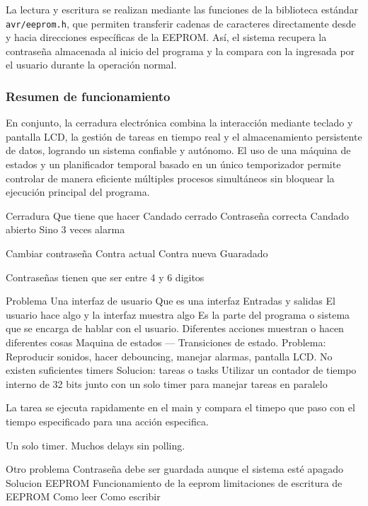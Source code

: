 La lectura y escritura se realizan mediante las funciones de la biblioteca estándar \texttt{avr/eeprom.h}, que permiten transferir cadenas de caracteres directamente desde y hacia direcciones específicas de la EEPROM. Así, el sistema recupera la contraseña almacenada al inicio del programa y la compara con la ingresada por el usuario durante la operación normal.

\vspace{1em}

\subsubsection{Resumen de funcionamiento}

En conjunto, la cerradura electrónica combina la interacción mediante teclado y pantalla LCD, la gestión de tareas en tiempo real y el almacenamiento persistente de datos, logrando un sistema confiable y autónomo. El uso de una máquina de estados y un planificador temporal basado en un único temporizador permite controlar de manera eficiente múltiples procesos simultáneos sin bloquear la ejecución principal del programa.


\vspace{1em}

Cerradura
Que tiene que hacer
Candado cerrado
Contraseña correcta
Candado abierto
Sino 3 veces alarma

Cambiar contraseña
Contra actual
Contra nueva
Guaradado

Contraseñas tienen que ser entre 4 y 6 digitos

Problema
Una interfaz de usuario
Que es una interfaz
Entradas y salidas
El usuario hace algo y la interfaz muestra algo
Es la parte del programa o sistema que se encarga
de hablar con el usuario.
Diferentes acciones muestran o hacen diferentes cosas
Maquina de estados --- Transiciones de estado.
Problema: Reproducir sonidos, hacer debouncing, manejar alarmas, pantalla LCD. 
No existen suficientes timers
Solucion: tareas o tasks
Utilizar un contador de tiempo interno de 32 bits
junto con un solo timer para manejar tareas en paralelo

La tarea se ejecuta rapidamente en el main y compara el timepo que paso con 
el tiempo especificado para una acción especifica.

Un solo timer. Muchos delays sin polling.

Otro problema
Contraseña debe ser guardada aunque el sistema esté apagado
Solucion EEPROM
Funcionamiento de la eeprom
limitaciones de escritura de EEPROM
Como leer
Como escribir

